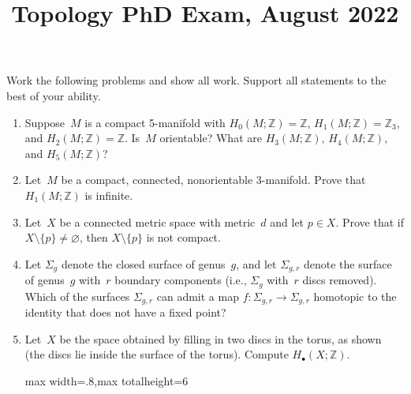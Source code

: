 \documentclass[11pt,letterpaper]{article}
\title{Topology PhD Exam, August 2022}
\author{}
\date{}
\newenvironment{examproblems}[2]{%
  \def\ProblemHeadingTag{#2}%
  \AssignTaggingSocketPlug{block/list/label}{examproblem}%
  \begin{enumerate}%
  \setcounter{enumi}{#1}%
  \renewcommand{\labelenumi}{\textbf{\theenumi.}}%
  \setlength{\topsep}{0.35em}%
  \setlength{\partopsep}{0pt}%
  \setlength{\itemsep}{0.48em}%
  \setlength{\parsep}{0.18em}%
}{\end{enumerate}}
\newenvironment{examinstructions}{%
  \par\begingroup\itshape
}{%
  \par\endgroup\vspace{0.18em}
}
\begin{document}
\maketitle
\thispagestyle{empty}
\begin{examinstructions}
Work the following problems and show all work. Support all statements to the best of your ability.
\end{examinstructions}
\begin{examproblems}{0}{H2}
\def\ProblemHeadingText{Problem 1.}
\item
Suppose~\(M\) is a compact 5-manifold with \(H_0(M;\mathbb{Z})=\mathbb{Z}\), \(H_1(M;\mathbb{Z})=\mathbb{Z}_3\), and \(H_2(M;\mathbb{Z})=\mathbb{Z}\). Is~\(M\) orientable? What are \(H_3(M;\mathbb{Z})\), \(H_4(M;\mathbb{Z})\), and \(H_5(M;\mathbb{Z})\)?
\def\ProblemHeadingText{Problem 2.}
\item
Let~\(M\) be a compact, connected, nonorientable 3-manifold. Prove that \(H_1(M;\mathbb{Z})\) is infinite.
\def\ProblemHeadingText{Problem 3.}
\item
Let~\(X\) be a connected metric space with metric~\(d\) and let \(p\in X\). Prove that if \(X\setminus\{p\}\ne\varnothing\), then \(X\setminus\{p\}\) is not compact.
\def\ProblemHeadingText{Problem 4.}
\item
Let \(\Sigma_g\) denote the closed surface of genus~\(g\), and let \(\Sigma_{g,r}\) denote the surface of genus~\(g\) with~\(r\) boundary components (i.e., \(\Sigma_g\) with~\(r\) discs removed). Which of the surfaces \(\Sigma_{g,r}\) can admit a map \(f:\Sigma_{g,r}\to\Sigma_{g,r}\) homotopic to the identity that does not have a fixed point?
\def\ProblemHeadingText{Problem 5.}
\item
Let~\(X\) be the space obtained by filling in two discs in the torus, as shown (the discs lie inside the surface of the torus). Compute \(H_\bullet(X;\mathbb{Z})\).
\par\smallskip
\begin{center}
\begin{adjustbox}{max width=.8\linewidth,max totalheight=6\baselineskip}
\end{adjustbox}
\end{center}
\end{examproblems}
\end{document}
